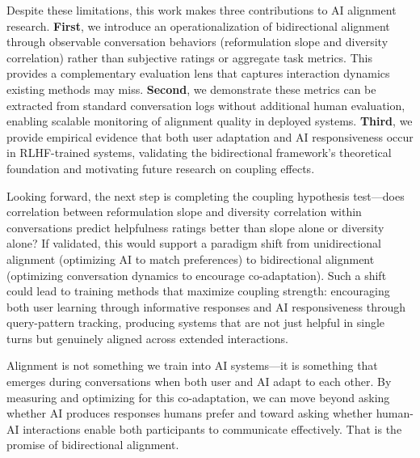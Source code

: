 Despite these limitations, this work makes three contributions to AI alignment research. \textbf{First}, we introduce an operationalization of bidirectional alignment through observable conversation behaviors (reformulation slope and diversity correlation) rather than subjective ratings or aggregate task metrics. This provides a complementary evaluation lens that captures interaction dynamics existing methods may miss. \textbf{Second}, we demonstrate these metrics can be extracted from standard conversation logs without additional human evaluation, enabling scalable monitoring of alignment quality in deployed systems. \textbf{Third}, we provide empirical evidence that both user adaptation and AI responsiveness occur in RLHF-trained systems, validating the bidirectional framework's theoretical foundation and motivating future research on coupling effects.

Looking forward, the next step is completing the coupling hypothesis test---does correlation between reformulation slope and diversity correlation within conversations predict helpfulness ratings better than slope alone or diversity alone? If validated, this would support a paradigm shift from unidirectional alignment (optimizing AI to match preferences) to bidirectional alignment (optimizing conversation dynamics to encourage co-adaptation). Such a shift could lead to training methods that maximize coupling strength: encouraging both user learning through informative responses and AI responsiveness through query-pattern tracking, producing systems that are not just helpful in single turns but genuinely aligned across extended interactions.

Alignment is not something we train into AI systems---it is something that emerges during conversations when both user and AI adapt to each other. By measuring and optimizing for this co-adaptation, we can move beyond asking whether AI produces responses humans prefer and toward asking whether human-AI interactions enable both participants to communicate effectively. That is the promise of bidirectional alignment.
